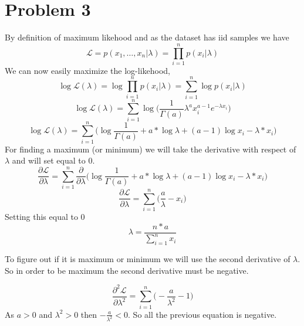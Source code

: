 \section{Problem 3}
By definition of maximum likehood and as the dataset has iid samples we have\\
\begin{equation*}
\mathcal{L} = p(x_1,\dots,x_n|\lambda) = \prod_{i=1}^n p(x_i|\lambda)
\end{equation*}
We can now easily maximize the log-likehood, 
\begin{equation*}
\log \mathcal{L}(\lambda) = \log\prod_{i=1}^n p(x_i|\lambda)=\sum_{i=1}^n \log p(x_i|\lambda)
\end{equation*}
\begin{equation*}
\log \mathcal{L}(\lambda) = \sum_{i=1}^n \log \biggl( \frac{1}{\Gamma(a)} \lambda^a x_i^{a-1} e^{-\lambda x_i} \biggr)
\end{equation*}
\begin{equation*}
\log \mathcal{L}(\lambda) = \sum_{i=1}^n \biggl( \log\frac{1}{\Gamma(a)} + a*\log\lambda + (a-1)\log{x_i} - \lambda*x_i \biggr)
\end{equation*}
For finding a maximum (or minimum) we will take the derivative with respect of $\lambda$ and will set equal to 0.
\begin{equation*}
\frac{\partial\mathcal{L}}{\partial\lambda} = \sum_{i=1}^n \frac{\partial}{\partial\lambda} \biggl( \log\frac{1}{\Gamma(a)} + a*\log\lambda + (a-1)\log{x_i} - \lambda*x_i \biggr)
\end{equation*}
\begin{equation*}
\frac{\partial\mathcal{L}}{\partial\lambda} = \sum_{i=1}^n \biggl( \frac{a}{\lambda} - x_i \biggr)
\end{equation*}
Setting this equal to 0
\begin{equation*}
\lambda = \frac{n*a}{\sum_{i=1}^n x_i}
\end{equation*}

To figure out if it is maximum or minimum we will use the second derivative of $\lambda$.
So in order to be maximum the second derivative must be negative.

\begin{equation*}
\frac{\partial^2\mathcal{L}}{\partial\lambda^2} = \sum_{i=1}^n \biggl( -\frac{a}{\lambda^2} -1 \biggr)
\end{equation*}
As $ a > 0 $ and $\lambda^2 > 0$ then $-\frac{a}{\lambda^2} < 0$. So all the previous equation is negative.
